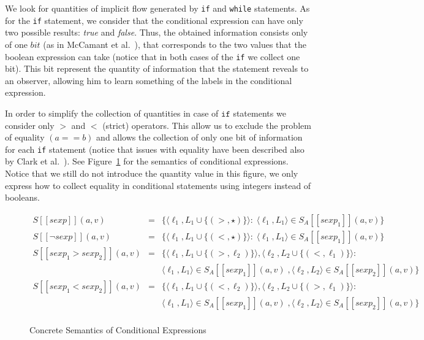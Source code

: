 \documentclass{llncs}
\begin{document}
\noindent We look for quantities of implicit flow generated by \texttt{if} and \texttt{while} statements. As for the \texttt{if} statement, we consider that the conditional expression can have only two possible results: \emph{true} and \emph{false}. Thus, the obtained information consists only of one $bit$ (as in McCamant et al.~\cite{McCamant07}), that corresponds to the two values that the boolean expression can take (notice that in both cases of the \texttt{if} we collect one bit). This bit represent the quantity of information that the statement reveals to an observer, allowing him to learn something of the labels in the conditional expression.


In order to simplify the collection of quantities in case of $\texttt{if}$ statements we consider only $>$ and $<$ (strict) operators. This allow us to exclude the problem of equality $(a==b)$ and allows the collection of only one bit of information for each \texttt{if} statement (notice that issues with equality have been described also by Clark et al.~\cite{city191,Clark04}).  See Figure~\ref{sem_cond} for the semantics of conditional expressions. Notice that we still do not introduce the quantity value in this figure, we only express how to collect equality in conditional statements using integers instead of booleans. 

\begin{figure}[H]
{\small \[
\begin{array}{rcl}
S [\![sexp]\!](a, v) & = &  \{  \langle \ell_1, L_1 \cup \{(>, \star)\} \rangle  : \;\langle \ell_1, L_1 \rangle \in  S_A [\![sexp_1 ]\!](a, v) \}\; \\
S [\![\neg sexp]\!](a, v) & = &  \{  \langle \ell_1, L_1 \cup \{(<, \star)\} \rangle : \;\langle \ell_1, L_1 \rangle \in  S_A [\![sexp_1 ]\!](a, v) \}\; \\
S [\![sexp_1 > sexp_2]\!](a, v) & = &  \{  \langle \ell_1, L_1 \cup \{(>, \ell_2)\} \rangle,  \langle \ell_2, L_2 \cup \{(< , \ell_1) \} \rangle : \; \\
& & \langle \ell_1, L_1 \rangle \in  S_A [\![sexp_1 ]\!](a, v) \; , \langle \ell_2, L_2 \rangle \in  S_A [\![sexp_2]\!](a, v) \}\; \\
S [\![sexp_1 < sexp_2]\!](a, v) & = & \{  \langle \ell_1, L_1 \cup \{(<, \ell_2)\} \rangle,  \langle \ell_2, L_2 \cup \{(> , \ell_1) \} \rangle : \; \\
& & \langle \ell_1, L_1 \rangle \in  S_A [\![sexp_1 ]\!](a, v) \; , \langle \ell_2, L_2 \rangle \in  S_A [\![sexp_2]\!](a, v) \}\; \\
\end{array}
\]}
\caption{Concrete Semantics of Conditional Expressions}
\label{sem_cond}
\end{figure} 
\end{document}
